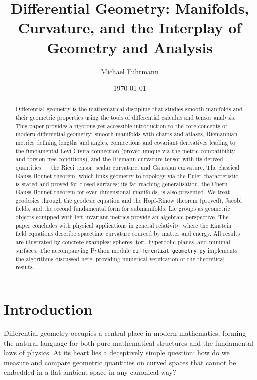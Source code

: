 \documentclass[12pt,a4paper]{amsart}
\author{Michael Fuhrmann}
\date{\today}
\theoremstyle{definition}
\begin{document}
\title{Differential Geometry: Manifolds, Curvature, and the Interplay of\\
Geometry and Analysis}

\begin{abstract}
Differential geometry is the mathematical discipline that studies smooth
manifolds and their geometric properties using the tools of differential
calculus and tensor analysis. This paper provides a rigorous yet accessible
introduction to the core concepts of modern differential geometry: smooth
manifolds with charts and atlases, Riemannian metrics defining lengths and
angles, connections and covariant derivatives leading to the fundamental
Levi-Civita connection (proved unique via the metric compatibility and
torsion-free conditions), and the Riemann curvature tensor with its derived
quantities --- the Ricci tensor, scalar curvature, and Gaussian curvature.
The classical Gauss-Bonnet theorem, which links geometry to topology via
the Euler characteristic, is stated and proved for closed surfaces; its
far-reaching generalisation, the Chern-Gauss-Bonnet theorem for even-dimensional
manifolds, is also presented. We treat geodesics through the geodesic
equation and the Hopf-Rinow theorem (proved), Jacobi fields, and the
second fundamental form for submanifolds. Lie groups as geometric objects
equipped with left-invariant metrics provide an algebraic perspective.
The paper concludes with physical applications in general relativity, where
the Einstein field equations describe spacetime curvature sourced by
matter and energy. All results are illustrated by concrete examples:
spheres, tori, hyperbolic planes, and minimal surfaces. The accompanying
Python module \texttt{differential\_geometry.py} implements the algorithms
discussed here, providing numerical verification of the theoretical results.
\end{abstract}

\maketitle
\tableofcontents

\section{Introduction}

Differential geometry occupies a central place in modern mathematics, forming
the natural language for both pure mathematical structures and the fundamental
laws of physics. At its heart lies a deceptively simple question: how do we
measure and compare geometric quantities on curved spaces that cannot be
embedded in a flat ambient space in any canonical way?
\end{document}
